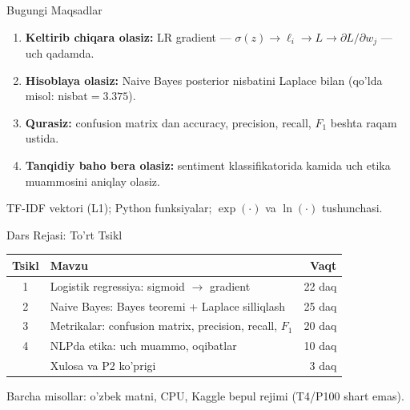 \documentclass[aspectratio=169,11pt]{beamer}
\begin{document}
\begin{frame}{Bugungi Maqsadlar}
  \begin{enumerate}\setlength{\itemsep}{7pt}
    \item \textbf{Keltirib chiqara olasiz:} LR gradient ---
          $\sigma(z)\!\to\!\ell_i\!\to\!L\!\to\!\partial L/\partial w_j$ ---
          uch qadamda.
    \item \textbf{Hisoblaya olasiz:} Naive Bayes posterior nisbatini
          Laplace bilan (qo'lda misol: nisbat$=3.375$).
    \item \textbf{Qurasiz:} confusion matrix dan accuracy, precision,
          recall, $F_1$ beshta raqam ustida.
    \item \textbf{Tanqidiy baho bera olasiz:} sentiment klassifikatorida
          kamida uch etika muammosini aniqlay olasiz.
  \end{enumerate}
  \vspace{5pt}
  \begin{tcolorbox}[defbox,title=Oldingi bilimlar]
    \small
    TF-IDF vektori (L1);\; Python funksiyalar;\;
    $\exp(\cdot)$ va $\ln(\cdot)$ tushunchasi.
  \end{tcolorbox}
\end{frame}

\begin{frame}{Dars Rejasi: To'rt Tsikl}
  \begin{center}
    \small
    \begin{tabular}{clr}
      \toprule
      Tsikl & Mavzu & Vaqt \\
      \midrule
      1 & Logistik regressiya: sigmoid $\to$ gradient & 22 daq \\
      2 & Naive Bayes: Bayes teoremi + Laplace silliqlash & 25 daq \\
      3 & Metrikalar: confusion matrix, precision, recall, $F_1$ & 20 daq \\
      4 & NLPda etika: uch muammo, oqibatlar & 10 daq \\
      \midrule
        & Xulosa va P2 ko'prigi & 3 daq \\
      \bottomrule
    \end{tabular}
  \end{center}
  \vspace{4pt}
  \small\textcolor{halfgray}{Barcha misollar: o'zbek matni, CPU,
  Kaggle bepul rejimi (T4/P100 shart emas).}
\end{frame}
\end{document}
